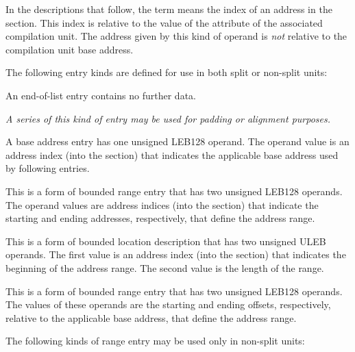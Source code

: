In the descriptions that follow, the term 
means the index of an address in the \dotdebugaddr{} section. This
index is relative to the value of the \DWATaddrbase{} attribute
of the associated compilation unit. The address given by this kind
of operand is \emph{not} relative to the compilation unit base 
address.
    
The following entry kinds are defined for use in both
split or non-split units:
\begin{enumerate}[1. ]
\itembfnl{\DWRLEendoflistTARG}
An end-of-list entry contains no further data.

\textit{A series of this kind of entry may be used for padding or
alignment purposes.}
      
\itembfnl{\DWRLEbaseaddressxTARG}
A base address entry has one unsigned LEB128 operand.
The operand value is an address index (into the \dotdebugaddr{} 
section) that indicates the applicable base address used by 
following \DWRLEoffsetpair{} entries.
    
\itembfnl{\DWRLEstartxendxTARG}
This is a form of bounded range entry that
has two unsigned LEB128 operands. The operand values are
address indices (into the \dotdebugaddr{} section) that indicate the
starting and ending addresses, respectively, that define
the address range.

\itembfnl{\DWRLEstartxlengthTARG}
This is a form of bounded location description that
has two unsigned ULEB operands. The first value is an address index
(into the \dotdebugaddr{} section) that indicates the beginning of 
the address range. The second value is the length of the range.
       
\itembfnl{\DWRLEoffsetpairTARG}
This is a form of bounded range entry that
has two unsigned LEB128 operands. The values of these
operands are the starting and ending offsets, respectively,
relative to the applicable base address, that define the
address range.

\end{enumerate} 

The following kinds of range entry may be used only in non-split 
units:
 
